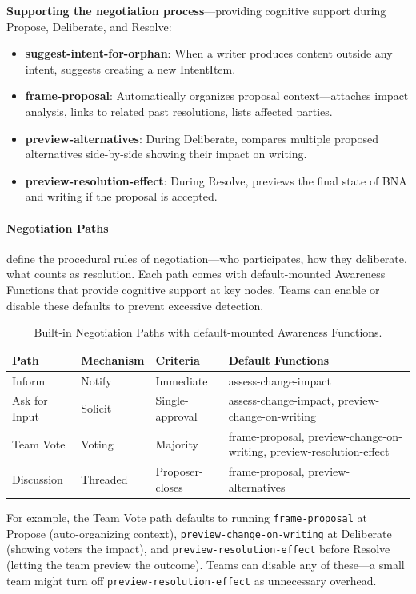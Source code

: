 \textbf{Supporting the negotiation process}---providing cognitive support during Propose, Deliberate, and Resolve:
\begin{itemize}[leftmargin=1.5em, itemsep=1pt]
\item \textbf{suggest-intent-for-orphan}: When a writer produces content outside any intent, suggests creating a new IntentItem.
\item \textbf{frame-proposal}: Automatically organizes proposal context---attaches impact analysis, links to related past resolutions, lists affected parties.
\item \textbf{preview-alternatives}: During Deliberate, compares multiple proposed alternatives side-by-side showing their impact on writing.
\item \textbf{preview-resolution-effect}: During Resolve, previews the final state of BNA and writing if the proposal is accepted.
\end{itemize}


\paragraph{Negotiation Paths} define the procedural rules of negotiation---who participates, how they deliberate, what counts as resolution. Each path comes with default-mounted Awareness Functions that provide cognitive support at key nodes. Teams can enable or disable these defaults to prevent excessive detection.

\begin{table}[t]
\small
\caption{Built-in Negotiation Paths with default-mounted Awareness Functions.}
\label{tab:negotiation-paths}
\begin{tabular}{@{}lllp{3.5cm}@{}}
\toprule
\textbf{Path} & \textbf{Mechanism} & \textbf{Criteria} & \textbf{Default Functions} \\
\midrule
Inform & Notify & Immediate & assess-change-impact \\
Ask for Input & Solicit & Single-approval & assess-change-impact, preview-change-on-writing \\
Team Vote & Voting & Majority & frame-proposal, preview-change-on-writing, preview-resolution-effect \\
Discussion & Threaded & Proposer-closes & frame-proposal, preview-alternatives \\
\bottomrule
\end{tabular}
\end{table}

\noindent For example, the Team Vote path defaults to running \texttt{frame-proposal} at Propose (auto-organizing context), \texttt{preview-change-on-writing} at Deliberate (showing voters the impact), and \texttt{preview-resolution-effect} before Resolve (letting the team preview the outcome). Teams can disable any of these---a small team might turn off \texttt{preview-resolution-effect} as unnecessary overhead.

